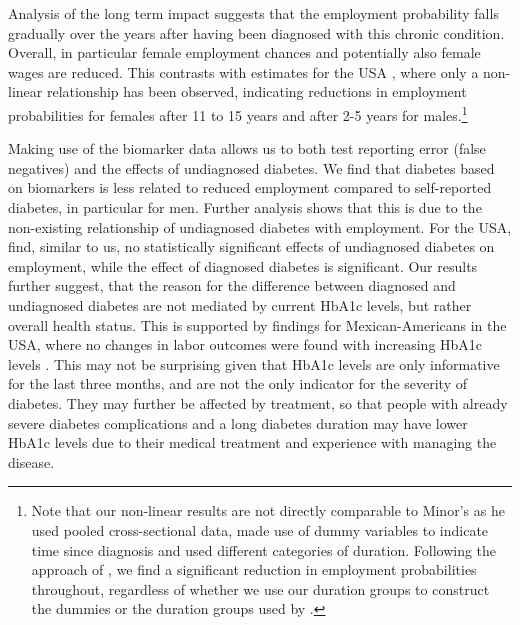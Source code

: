\documentclass[12pt,english]{article}
\begin{document}
Analysis of the long term impact suggests that the employment probability falls gradually over the years after having been diagnosed with this chronic condition. Overall, in particular female employment chances and potentially also female wages are reduced. This contrasts with estimates for the USA \parencite{Minor2013}, where only a non-linear relationship has been observed, indicating reductions in employment probabilities for females after 11 to 15 years and after 2-5 years for males.\footnote{Note that our non-linear results are not directly comparable to Minor's as he used pooled cross-sectional data, made use of dummy variables to indicate time since diagnosis and used different categories of duration. Following the approach of \textcite{Minor2013}, we find a significant reduction in employment probabilities throughout, regardless of whether we use our duration groups to construct the dummies or the duration groups used by \textcite{Minor2013}.} 

Making use of the biomarker data allows us to both test reporting error (false negatives) and the effects of undiagnosed diabetes. We find that diabetes based on biomarkers is less related to reduced employment compared to self-reported diabetes, in particular for men. Further analysis shows that this is due to the non-existing relationship of undiagnosed diabetes with employment. For the USA, \textcite{Minor2015} find, similar to us, no statistically significant effects of undiagnosed diabetes on employment, while the effect of diagnosed diabetes is significant. Our results further suggest, that the reason for the difference between diagnosed and undiagnosed diabetes are not mediated by current \ac{HbA1c} levels, but rather overall health status. This is supported by findings for Mexican-Americans in the USA, where no changes in labor outcomes were found with increasing \ac{HbA1c} levels \parencite{BrownIII2011}. This may not be surprising given that \ac{HbA1c} levels are only informative for the last three months, and are not the only indicator for the severity of diabetes. They may further be affected by treatment, so that people with already severe diabetes complications and a long diabetes duration may have lower \ac{HbA1c} levels due to their medical treatment and experience with managing the disease.
\end{document}
